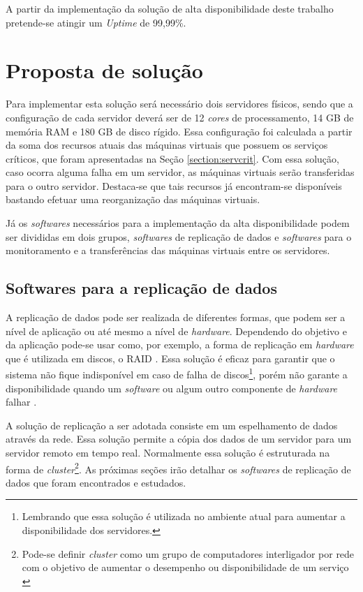 A partir da implementação da solução de alta disponibilidade deste trabalho pretende-se atingir um \textit{Uptime} de 99,99\%.

\section{Proposta de solução}
\label{section:propostasolucao}

Para implementar esta solução será necessário dois servidores físicos, sendo que a configuração de cada servidor deverá ser de 
12 \textit{cores} de processamento, 14 GB de memória \ac{RAM} e 180 GB de disco rígido. Essa configuração foi calculada a partir da soma dos 
recursos atuais das máquinas virtuais que possuem os serviços críticos, que foram apresentadas na Seção \ref{section:servcrit}.
Com essa solução, caso ocorra alguma falha em um servidor, as máquinas virtuais serão transferidas para o outro servidor.
Destaca-se que tais recursos já encontram-se disponíveis bastando efetuar uma reorganização das máquinas virtuais.

Já os \textit{softwares} necessários para a implementação da alta disponibilidade podem ser divididas em dois grupos, \textit{softwares} de 
replicação de dados e \textit{softwares} para o monitoramento e a transferências das máquinas virtuais entre os servidores.

\subsection{Softwares para a replicação de dados}
\label{section:toolrepl}

A replicação de dados pode ser realizada de diferentes formas, que podem ser a nível de aplicação ou até mesmo a nível de \textit{hardware}.
Dependendo do objetivo e da aplicação pode-se usar como, por exemplo, a forma de replicação em \textit{hardware} que é utilizada em discos, o 
\ac{RAID} \cite{tanenbaum2009sistemas}. Essa solução é eficaz para garantir que o sistema não fique indisponível em caso de falha de 
discos\footnote[2]{Lembrando que essa solução é utilizada no ambiente atual para aumentar a disponibilidade dos servidores.}, porém não garante 
a disponibilidade quando um \textit{software} ou algum outro componente de \textit{hardware} falhar \cite{zaminhani2008}.

A solução de replicação a ser adotada consiste em um espelhamento de dados através da rede. Essa solução permite a cópia dos dados de um servidor
para um servidor remoto em tempo real. Normalmente essa solução é estruturada na forma de \textit{cluster}\footnote[3]{Pode-se definir 
\textit{cluster} como um grupo de computadores interligador por rede com o objetivo de aumentar o desempenho ou disponibilidade de um serviço 
\cite{freitas2005}}.
As próximas seções irão detalhar os \textit{softwares} de replicação de dados que foram encontrados e estudados.

